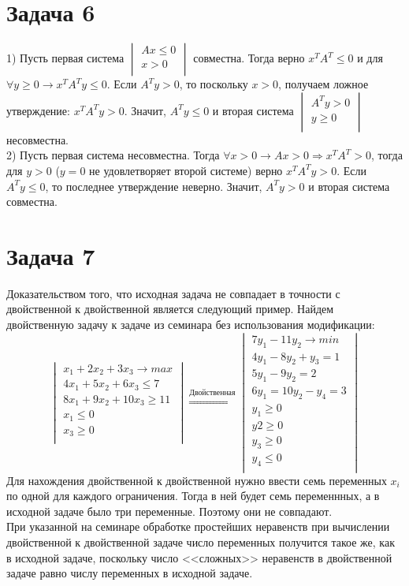 \documentclass[a4paper,12pt]{article} %
\begin{document}
 \section*{Задача 6}
 1) Пусть первая система 
 $\begin{vmatrix}
 Ax\leq 0\\
 x>0\\
 \end{vmatrix}$
 совместна.  Тогда верно $x^{T}A^{T}\leq 0$ и для $\forall y  \geq 0 \rightarrow x^{T}A^{T}y \leq 0$. Если $A^{T}y > 0$, то поскольку $x >0$, получаем ложное утверждение: $x^{T}A^{T}y > 0$. Значит, $A^{T}y \leq 0$ и вторая система  $\begin{vmatrix}
 A^{T}y > 0\\
 y \geq 0\\
 \end{vmatrix}$ несовместна.\\
 
 2) Пусть первая система несовместна. Тогда $\forall x > 0 \rightarrow Ax >0 \Rightarrow x^{T}A^{T} > 0 $, тогда для $y >0$ ($y=0$ не удовлетворяет второй системе) верно $x^{T}A^{T}y > 0 $. Если $A^{T}y \leq 0$, то последнее утверждение неверно. Значит, $A^{T}y > 0$ и вторая система совместна.\\
  

\section*{Задача 7}
Доказательством того, что исходная задача не совпадает в точности с двойственной к двойственной является следующий пример. Найдем двойственную задачу к задаче из семинара без использования модификации: \\
\[
\begin{vmatrix}
x_1+2x_2+3x_3 \rightarrow max\\
4x_1+5x_2+6x_3\leq 7 \\
8x_1+9x_2+10x_3\geq 11\\
x_1\leq0\\
x_3\geq 0\\
\end{vmatrix}
\overset{\text{Двойственная}}{\Rightarrow}
\begin{vmatrix}
7y_1-11y_2\rightarrow min\\
4y_1-8y_2+y_3=1\\
5y_1-9y_2=2\\
6y_1=10y_2-y_4=3\\
y_1\geq 0\\	
y2\geq 0\\
y_3\geq 0\\
y_4\leq 0\\
\end{vmatrix}
\]
 Для нахождения двойственной к двойственной нужно ввести семь переменных $x_i$ по одной для каждого ограничения. Тогда в ней будет семь переменнных, а в исходной задаче было три переменные. Поэтому они не совпадают.\\
 
 При указанной на семинаре обработке простейших неравенств при вычислении двойственной к двойственной задаче число переменных получится такое же, как в исходной задаче, поскольку число <<сложных>> неравенств в двойственной задаче равно числу переменных в исходной задаче. \\ 
 

  
\end{document}
